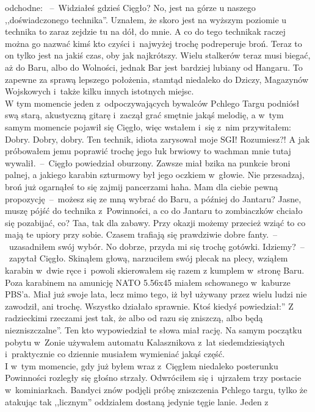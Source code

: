 \documentclass[../MAIN.tex]{subfiles}
\begin{document}
odchodne: ~--~Widziałeś gdzieś Cięgło?
\xx No, jest na górze u naszego ,,doświadczonego technika''.
\qd
Uznałem, że skoro jest na wyższym poziomie u technika to zaraz
zejdzie tu na dół, do mnie. A co do tego technika\3k raczej
można go nazwać kimś kto czyści i~najwyżej trochę podreperuje
broń.
Teraz to on tylko jest na jakiś czas, oby jak najkrótszy. Wielu
stalkerów teraz musi biegać, aż do Baru, albo do Wolności,
jednak Bar jest bardziej lubiany od Hangaru. To zapewne za
sprawą lepszego położenia, stamtąd niedaleko do Dziczy,
Magazynów Wojskowych i~także kilku innych istotnych miejsc.
\\
W tym momencie jeden z~odpoczywających bywalców Pchlego Targu
podniósł swą starą, akustyczną gitarę i~zaczął grać smętnie
jakąś melodię, a w~tym samym momencie pojawił się Cięgło, więc
wstałem i~się z~nim przywitałem:
%
\sx Dobry.
\xx Dobry, dobry. Ten technik, idiota zarysował moje SGI!
Rozumiesz?! A jak próbowałem jemu poprawić trochę jego łuk
brwiowy to wachman mnie tutaj wywalił.~--~Cięgło powiedział
oburzony. Zawsze miał bzika na punkcie broni palnej, a jakiego
karabin szturmowy był jego oczkiem w~głowie.
\xx Nie przesadzaj, broń już ogarnąłeś to się zajmij pancerzami
haha. Mam dla ciebie pewną propozycję~--~możesz się ze mną
wybrać
do Baru, a później do Jantaru?
\xx Jasne, muszę pójść do technika z~Powinności, a co do
Jantaru
to zombiaczków chciało się pozabijać, co?
\xx Taa, tak dla zabawy. Przy okazji możemy przecież wziąć to
co
mają te upiory przy sobie. Czasem trafiają się prawdziwie dobre
fanty.~--~uzasadniłem swój wybór.
\xx No dobrze, przyda mi się trochę gotówki.
Idziemy?~--~zapytał
Cięgło.
\qd
Skinąłem głową, narzuciłem swój plecak na plecy,
wziąłem karabin w~dwie ręce i~powoli skierowałem się razem z
kumplem w~stronę Baru. Poza karabinem na amunicję NATO 5.56x45
miałem schowanego w~kaburze PBS’a. Miał już swoje lata, lecz
mimo tego, iż był używany przez wielu ludzi nie zawodził, ani
trochę. Wszystko działało sprawnie. Ktoś kiedyś powiedział:'' Z
radzieckimi rzeczami jest tak, że albo od razu się zniszczą,
albo będą niezniszczalne''. Ten kto wypowiedział te słowa miał
rację. Na samym początku pobytu w~Zonie używałem automatu
Kalasznikova z~lat siedemdziesiątych i~praktycznie co dziennie
musiałem wymieniać jakąś część.
\\
I w~tym momencie, gdy już byłem wraz z~Cięgłem niedaleko
posterunku Powinności rozległy się głośno strzały.
%
%
Odwróciłem się i~ujrzałem trzy postacie w~kominiarkach. Bandyci
znów podjęli próbę zniszczenia Pchlego targu, tylko że atakując
tak ,,licznym'' oddziałem dostaną jedynie tęgie lanie. Jeden z
\end{document}
